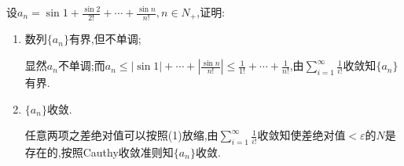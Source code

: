\documentclass[cn,chinese,fontset]{elegantbook}
\begin{document}
            \begin{exercise}
                设$a_n=\sin1+\frac{\sin2}{2!}+\cdots+\frac{\sin n}{n!},n\in N_+$,证明:
                \begin{enumerate}
                    \item 数列$\{a_n\}$有界,但不单调;
                    \begin{solution}
                        显然$a_n$不单调;而$a_n\leqslant\left|\sin1\right|+\cdots+\left|\frac{\sin n}{n!}\right|\leqslant\frac{1}{1!}+\cdots+\frac{1}{n!}$,由$\sum_{i=1}^\infty\frac{1}{i!}$收敛知$\{a_n\}$有界.
                    \end{solution}
                    \item $\{a_n\}$收敛.
                    \begin{solution}
                        任意两项之差绝对值可以按照(1)放缩,由$\sum_{i=1}^\infty\frac{1}{i!}$收敛知使差绝对值$<\varepsilon$的$N$是存在的,按照Cauthy收敛准则知$\{a_n\}$收敛.
                    \end{solution}
                \end{enumerate}
            \end{exercise}
\end{document}
